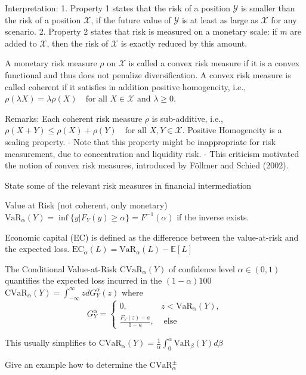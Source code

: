 Interpretation:  
1. Property 1 states that the risk of a position \(\mathcal{Y}\) is smaller than the risk of a position \(\mathcal{X}\), 
   if the future value of \(\mathcal{Y}\) is at least as large as \(\mathcal{X}\) for any scenario.  
2. Property 2 states that risk is measured on a monetary scale: if \(m\) are added to \(\mathcal{X}\), 
   then the risk of \(\mathcal{X}\) is exactly reduced by this amount.

A monetary risk measure \(\rho\) on \(\mathcal{X}\) is called a convex risk measure 
if it is a convex functional and thus does not penalize diversification.
A convex risk measure is called coherent if it satisfies in addition positive homogeneity, i.e.,
\(
\rho(\lambda X) = \lambda \rho(X) \quad \text{for all } X \in \mathcal{X} \text{ and } \lambda \geq 0.
\)

Remarks:
Each coherent risk measure \(\rho\) is sub-additive, i.e.,
\(
\rho(X + Y) \leq \rho(X) + \rho(Y) \quad \text{for all } X, Y \in \mathcal{X}.
\)
Positive Homogeneity is a scaling property.
- Note that this property might be inappropriate for risk measurement, due to concentration and liquidity risk.
- This criticism motivated the notion of convex risk measures, introduced by Föllmer and Schied (2002).


State some of the relevant risk measures in financial intermediation

Value at Risk (not coherent, only monetary)
\( \text{VaR}_{\alpha}(Y) = \inf\{y|F_Y(y) \geq \alpha\} = F^{-1}(\alpha) \)
if the inverse exists.

Economic capital (EC)
is defined as the difference between the value-at-risk and the expected loss.
\( \text{EC}_\alpha(L) = \text{VaR}_{\alpha}(L) - \mathbb{E}[L] \)

The Conditional Value-at-Risk \( \text{CVaR}_{\alpha}(Y) \) of confidence level
\( \alpha \in (0,1) \) quantifies the expected loss incurred in the \( (1 - \alpha)100 \)%
\( \text{CVaR}_{\alpha}(Y) = \int_{-\infty}^\infty z dG^\alpha_Y(z) \)
where 
\[ G^\alpha_Y = \begin{cases}
    0, & z < \text{VaR}_\alpha(Y), \\
    \frac{F_Y(z) - a}{1 - a},& \text{ else}
\end{cases}
\]

This usually simplifies to
\( \text{CVaR}_{\alpha}(Y) = \frac{1}{\alpha}\int_0^\alpha \text{VaR}_{\beta}(Y) d\beta \)



Give an example how to determine the \( \text{CVaR}_{\alpha}^\pm \)

